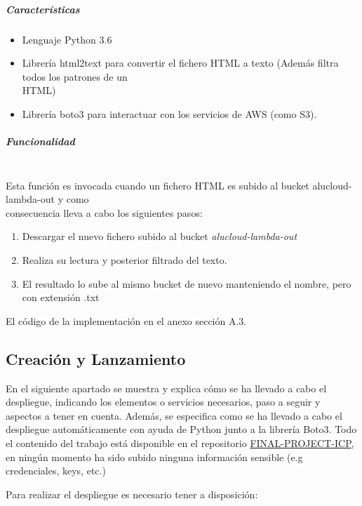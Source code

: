 \documentclass[
]{article}
\begin{document}
\hypertarget{header-n94}{%
\subparagraph{Características}\label{header-n94}}

\begin{itemize}
\item
  Lenguaje Python 3.6
\item
  Librería html2text para convertir el fichero HTML a texto (Además
  filtra todos los patrones de un\\
  HTML)
\item
  Librería boto3 para interactuar con los servicios de AWS (como S3).
\end{itemize}

\hypertarget{header-n102}{%
\subparagraph{Funcionalidad}\label{header-n102}}
\leavevmode
\newline
\\
Esta función es invocada cuando un fichero HTML es subido al bucket
alucloud-lambda-out y como\\
consecuencia lleva a cabo los siguientes pasos:

\begin{enumerate}
\def\labelenumi{\arabic{enumi}.}
\item
  Descargar el nuevo fichero subido al bucket \emph{alucloud-lambda-out}
\item
  Realiza su lectura y posterior filtrado del texto.
\item
  El resultado lo sube al mismo bucket de nuevo manteniendo el nombre,
  pero con extensión .txt
\end{enumerate}

El código de la implementación en el anexo sección A.3.

\hypertarget{header-n112}{%
\subsection{Creación y Lanzamiento}\label{header-n112}}

En el siguiente apartado se muestra y explica cómo se ha llevado a cabo
el despliegue, indicando los elementos o servicios necesarios, paso a
seguir y aspectos a tener en cuenta. Además, se especifica como se ha
llevado a cabo el despliegue automáticamente con ayuda de Python junto a
la librería Boto3. Todo el contenido del trabajo está disponible en el repositorio \underline{\href{https://github.com/manujose94/FINAL-PROJECT-ICP}{FINAL-PROJECT-ICP}}, en ningún momento ha sido subido ninguna información sensible (e.g credenciales, keys, etc.) 

Para realizar el despliegue es necesario tener a disposición:
\end{document}
